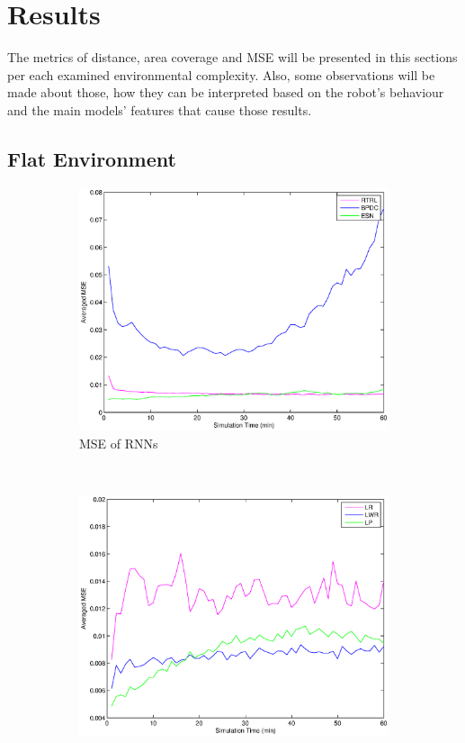 \documentclass[msc,ai,logo]{infthesis}
\begin{document}
\section{Results}   
The metrics of distance, area coverage and MSE will be presented in this sections per each examined environmental complexity. Also, some observations will be made about those, how they can be interpreted based on the robot's behaviour and the main models' features that cause those results. 
\subsection{Flat Environment}
\begin{figure}[H]
        \centering
        \label{fig:00_MSE}
        \begin{subfigure}[b]{0.49\textwidth}
                \centering
                \includegraphics[width=\textwidth]{RNN_00_MSE.eps}
                \caption{MSE of RNNs}
              \label{fig:RNN_00_MSE}  
        \end{subfigure}%
        ~ %
        \begin{subfigure}[b]{0.49\textwidth}
                \centering
                \includegraphics[width=\textwidth]{LR_00_MSE.eps}

\end{subfigure}
\end{figure}
\end{document}
